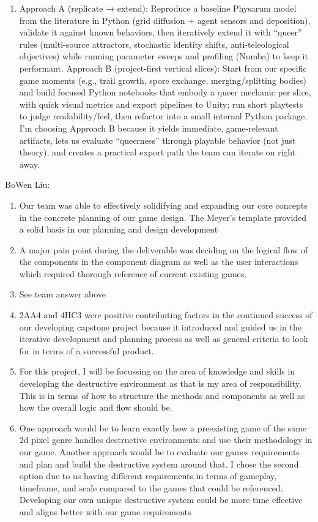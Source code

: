 \documentclass{article}
\begin{document}
\begin{enumerate}
\item Approach A (replicate → extend): Reproduce a baseline Physarum model from the literature in Python (grid diffusion + agent sensors and deposition), validate it against known behaviors, then iteratively extend it with “queer” rules (multi-source attractors, stochastic identity shifts, anti-teleological objectives) while running parameter sweeps and profiling (Numba) to keep it performant. Approach B (project-first vertical slices): Start from our specific game moments (e.g., trail growth, spore exchange, merging/splitting bodies) and build focused Python notebooks that embody a queer mechanic per slice, with quick visual metrics and export pipelines to Unity; run short playtests to judge readability/feel, then refactor into a small internal Python package. I’m choosing Approach B because it yields immediate, game-relevant artifacts, lets us evaluate “queerness” through playable behavior (not just theory), and creates a practical export path the team can iterate on right away.
\end{enumerate}

BoWen Liu:
\begin{enumerate}
\item Our team was able to effectively solidifying and expanding our core concepts in the concrete planning of our game design. The Meyer’s template provided a solid basis in our planning and design development
\item A major pain point during the deliverable was deciding on the logical flow of the components in the component diagram as well as the user interactions which required thorough reference of current existing games.
\item See team answer above
\item 2AA4 and 4HC3 were positive contributing factors in the continued success of our developing capstone project because it introduced and guided us in the iterative development and planning process as well as general criteria to look for in terms of a successful product.
\item For this project, I will be focussing on the area of knowledge and skills in developing the destructive environment as that is my area of responsibility. This is in terms of how to structure the methods and components as well as how the overall logic and flow should be.
\item One approach would be to learn exactly how a preexisting game of the same 2d pixel genre handles destructive environments and use their methodology in our game. Another approach would be to evaluate our games requirements and plan and build the destructive system around that. I chose the second option due to us having different requirements in terms of gameplay, timeframe, and scale compared to the games that could be referenced. Developing our own unique destructive system could be more time effective and aligns better with our game requirements
\end{enumerate}
\end{document}
